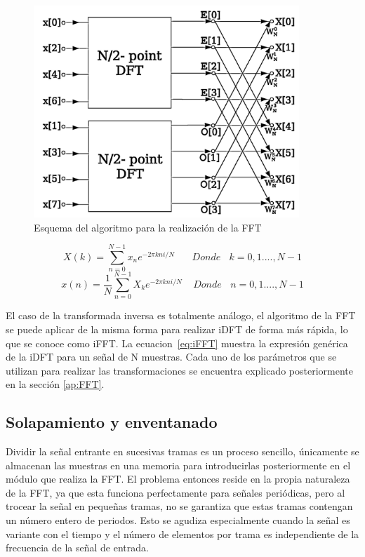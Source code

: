 \begin{figure}[!ht]
\begin{center}
\includegraphics[width=10cm]{img/dft.png}
\caption{\label{fig:fft}Esquema del algoritmo para la realización de la FFT}
\end{center}
\end{figure}

\begin{equation}
\label{eq:FFT}
X(k) =  \sum_{n = 0}^{N - 1} x_{n}e^{-2\pi kni/N}~~~~~~~~Donde~~~~k = 0, 1...., N-1
\end{equation}
\begin{equation}
\label{eq:iFFT}
x(n) = \frac{1}{N} \sum_{n = 0}^{N - 1} X_{k}e^{-2\pi kni/N}~~~~~Donde~~~~n = 0, 1...., N-1
\end{equation}

El caso de la transformada inversa es totalmente análogo, el algoritmo de la FFT se puede aplicar de la misma forma para realizar iDFT de forma más rápida, lo que se conoce como iFFT. La ecuacion~\ref{eq:iFFT} muestra la expresión genérica de la iDFT para un señal de N muestras. Cada uno de los parámetros que se utilizan para realizar las transformaciones se encuentra explicado posteriormente en la sección \ref{ap:FFT}.

\subsection{Solapamiento y enventanado}

Dividir la señal entrante en sucesivas tramas es un proceso sencillo, únicamente se almacenan las muestras en una memoria para introducirlas posteriormente en el módulo que realiza la FFT. El problema entonces reside en la propia naturaleza de la FFT, ya que esta funciona perfectamente para señales periódicas, pero al trocear la señal en pequeñas tramas, no se garantiza que estas tramas contengan un número entero de periodos. Esto se agudiza especialmente cuando la señal es variante con el tiempo y el número de elementos por trama es independiente de la frecuencia de la señal de entrada.

